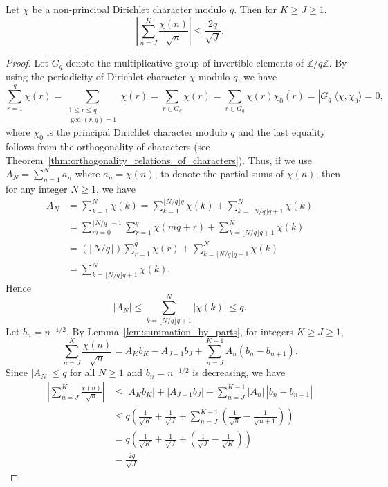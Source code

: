 \documentclass{elegantbook}
\begin{document}
\begin{lemma} \label{lem:bound_for_partial_sums_of_non_principal_dirichlet_characters}
    Let $\chi$ be a non-principal Dirichlet character modulo $q$. Then for $K\geq J \geq 1$,
    \[
        \left|\sum_{n=J}^{K} \frac{\chi(n)}{\sqrt{n}}\right| \leq \frac{2q}{\sqrt{J}}.
    \]
\end{lemma}

\begin{proof}
    Let $G_q$ denote the multiplicative group of invertible elements of $\mathbb{Z}/ q\mathbb{Z}$. By using the periodicity of Dirichlet character $\chi$ modulo $q$, we have
    \[
        \sum_{r=1}^{q}\chi(r)
        =\sum_{\substack{1\le r\le q\\ \gcd(r,q)=1}}\chi(r)
        =\sum_{r\in G_q}\chi(r)
        =\sum_{r\in G_q}\chi(r)\overline{\chi_0(r)}
        =|G_q|\langle \chi,\chi_0\rangle
        =0,
    \]
    where $\chi_0$ is the principal Dirichlet character modulo $q$ and the last equality follows from the orthogonality of characters (see Theorem~\ref{thm:orthogonality_relations_of_characters}).
    Thus, if we use $A_N=\sum_{n=1}^N a_n$ where $a_n=\chi(n)$, to denote the partial sums of $\chi(n)$, then for any integer $N\ge 1$, we have
    \begin{align*}
      A_N &= \sum_{k=1}^{N}\chi(k)
      =\sum_{k=1}^{\lfloor N/q \rfloor q}\chi(k) + \sum_{k=\lfloor N/q \rfloor q + 1}^{N}\chi(k) \\
      &=\sum_{m=0}^{\lfloor N/q \rfloor -1}\sum_{r=1}^{q}\chi(mq+r) + \sum_{k=\lfloor N/q \rfloor q + 1}^{N}\chi(k) \\
      &=(\lfloor N/q \rfloor)\sum_{r=1}^{q}\chi(r) + \sum_{k=\lfloor N/q \rfloor q+1}^{N}\chi(k) \\
      &=\sum_{k=\lfloor N/q \rfloor q+1}^{N}\chi(k).
    \end{align*}
    Hence
    \[
      |A_N| \le \sum_{k=\lfloor N/q \rfloor q+1}^{N}|\chi(k)| \le q.
    \]
    Let $b_n=n^{-1/2}$. By Lemma~\ref{lem:summation_by_parts}, for integers $K \ge J\ge 1$,
    \[
        \sum_{n=J}^{K} \frac{\chi(n)}{\sqrt{n}} = A_K b_K - A_{J-1} b_{J} + \sum_{n=J}^{K-1} A_n (b_n - b_{n+1}).
    \]
    Since $|A_N| \leq q$ for all $N \geq 1$ and $b_n = n^{-1/2}$ is decreasing, we have
    \[
    \begin{aligned}
        \left|\sum_{n=J}^K \frac{\chi(n)}{\sqrt{n}}\right|
        &\leq |A_K b_K| + |A_{J-1} b_{J}| + \sum_{n=J}^{K-1} |A_n|\, |b_n - b_{n+1}| \\
        &\leq q \left( \frac{1}{\sqrt{K}} + \frac{1}{\sqrt{J}} + \sum_{n=J}^{K-1} \left( \frac{1}{\sqrt{n}} - \frac{1}{\sqrt{n+1}} \right) \right) \\
        &= q \left( \frac{1}{\sqrt{K}} + \frac{1}{\sqrt{J}} + \left( \frac{1}{\sqrt{J}} - \frac{1}{\sqrt{K}} \right) \right) \\
        &= \frac{2q}{\sqrt{J}}
    \end{aligned}
    \]
\end{proof}
\end{document}

